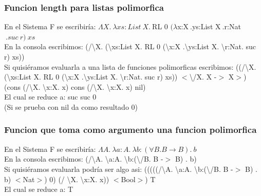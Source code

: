\documentclass[12pt, titlepage, a4paper]{article}
\begin{document}
\subsubsection{Funcion length para listas polimorfica}
\noindent En el Sistema F se escribiría: $\Lambda X.\ \lambda xs:List \ X. \ $RL 0 $(\lambda $x:X$ \ .$ys:List X$ \ .$r:Nat$\ .suc\ r)\ xs$ \\
En la consola escribimos: (/\textbackslash X. (\textbackslash xs:List X. RL 0 (\textbackslash x:X .\textbackslash ys:List X. \textbackslash r:Nat. suc r) xs)) \\
Si quisiéramos evaluarla a una lista de funciones polimorficas escribimos: 
((/\textbackslash X. (\textbackslash xs:List X. RL 0 (\textbackslash x:X .\textbackslash ys:List X. \textbackslash r:Nat. suc r) xs)) $<$\textbackslash/X. X -$>$ X$>$) 
(cons (/\textbackslash X. \textbackslash x:X. x) cons (/\textbackslash X. \textbackslash x:X. x) nil)\\
El cual se reduce a: suc suc 0 \\

\noindent (Si se prueba con nil da como resultado 0)

\subsubsection{Funcion que toma como argumento una funcion polimorfica}
\noindent En el Sistema F se escribiría: $\Lambda A.\ \lambda a:A.\ \lambda b:(\forall B. B \rightarrow  B). \ b$ \\
En la consola escribimos: (/\textbackslash A. \textbackslash a:A. \textbackslash b:(\textbackslash /B. B -$>$ B) . b)\\
Si quisiéramos evaluarla podría ser algo asi: (((((/\textbackslash A. \textbackslash a:A. \textbackslash b:(\textbackslash /B. B -$>$ B) . b) $<$Nat$>$) 0) (/ \textbackslash X. \textbackslash x:X. x)) $<$Bool$>$) T\\
El cual se reduce a: T




\end{document}
